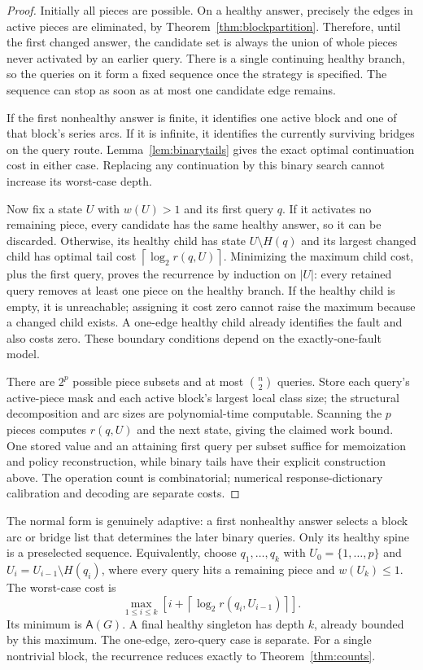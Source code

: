 \documentclass[11pt,letterpaper]{article}
\newcommand{\ceil}[1]{\left\lceil #1\right\rceil}
\newcommand{\A}{\mathsf A}
\begin{document}
\begin{proof}
Initially all pieces are possible. On a healthy answer, precisely the edges in active pieces are eliminated, by Theorem~\ref{thm:blockpartition}. Therefore, until the first changed answer, the candidate set is always the union of whole pieces never activated by an earlier query. There is a single continuing healthy branch, so the queries on it form a fixed sequence once the strategy is specified. The sequence can stop as soon as at most one candidate edge remains.

If the first nonhealthy answer is finite, it identifies one active block and one of that block's series arcs. If it is infinite, it identifies the currently surviving bridges on the query route. Lemma~\ref{lem:binarytails} gives the exact optimal continuation cost in either case. Replacing any continuation by this binary search cannot increase its worst-case depth.

Now fix a state $U$ with $w(U)>1$ and its first query $q$. If it activates no remaining piece, every candidate has the same healthy answer, so it can be discarded. Otherwise, its healthy child has state $U\setminus H(q)$ and its largest changed child has optimal tail cost $\ceil{\log_2 r(q,U)}$. Minimizing the maximum child cost, plus the first query, proves the recurrence by induction on $|U|$: every retained query removes at least one piece on the healthy branch. If the healthy child is empty, it is unreachable; assigning it cost zero cannot raise the maximum because a changed child exists. A one-edge healthy child already identifies the fault and also costs zero. These boundary conditions depend on the exactly-one-fault model.

There are $2^p$ possible piece subsets and at most $\binom n2$ queries. Store each query's active-piece mask and each active block's largest local class size; the structural decomposition and arc sizes are polynomial-time computable. Scanning the $p$ pieces computes $r(q,U)$ and the next state, giving the claimed work bound. One stored value and an attaining first query per subset suffice for memoization and policy reconstruction, while binary tails have their explicit construction above. The operation count is combinatorial; numerical response-dictionary calibration and decoding are separate costs.
\end{proof}

The normal form is genuinely adaptive: a first nonhealthy answer selects a block arc or bridge list that determines the later binary queries. Only its healthy spine is a preselected sequence. Equivalently, choose $q_1,\ldots,q_k$ with $U_0=\{1,\ldots,p\}$ and $U_i=U_{i-1}\setminus H(q_i)$, where every query hits a remaining piece and $w(U_k)\le1$. The worst-case cost is
\[
 \max_{1\le i\le k}\left[i+\ceil{\log_2 r(q_i,U_{i-1})}\right].
\]
Its minimum is $\A(G)$. A final healthy singleton has depth $k$, already bounded by this maximum. The one-edge, zero-query case is separate. For a single nontrivial block, the recurrence reduces exactly to Theorem~\ref{thm:counts}.
\end{document}
